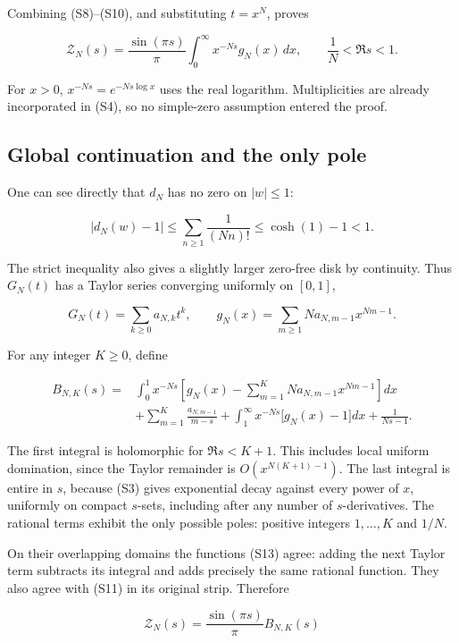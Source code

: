 Combining (S8)--(S10), and substituting \(t=x^N\), proves

\[
\boxed{\mathcal Z_N(s)=\frac{\sin(\pi s)}{\pi}
\int_0^\infty x^{-Ns}g_N(x)\,dx,
\qquad \frac1N<\Re s<1.}
\tag{S11}
\]

For \(x>0\), \(x^{-Ns}=e^{-Ns\log x}\) uses the real logarithm.
Multiplicities are already incorporated in (S4), so no simple-zero
assumption entered the proof.

\hypertarget{global-continuation-and-the-only-pole}{%
\subsection{Global continuation and the only
pole}\label{global-continuation-and-the-only-pole}}

One can see directly that \(d_N\) has no zero on \(|w|\le1\):

\[
|d_N(w)-1|\le\sum_{n\ge1}\frac1{(Nn)!}
\le\cosh(1)-1<1.
\]

The strict inequality also gives a slightly larger zero-free disk by
continuity. Thus \(G_N(t)\) has a Taylor series converging uniformly on
\([0,1]\),

\[
G_N(t)=\sum_{k\ge0}a_{N,k}t^k,
\qquad g_N(x)=\sum_{m\ge1}N a_{N,m-1}x^{Nm-1}.
\tag{S12}
\]

For any integer \(K\ge0\), define

\[
\begin{aligned}
B_{N,K}(s)={}&
\int_0^1x^{-Ns}\left[g_N(x)-\sum_{m=1}^{K}N a_{N,m-1}x^{Nm-1}\right]dx\\
&+\sum_{m=1}^{K}\frac{a_{N,m-1}}{m-s}
 +\int_1^\infty x^{-Ns}\bigl[g_N(x)-1\bigr]dx
 +\frac1{Ns-1}.
\end{aligned}
\tag{S13}
\]

The first integral is holomorphic for \(\Re s<K+1\). This includes local
uniform domination, since the Taylor remainder is \(O(x^{N(K+1)-1})\).
The last integral is entire in \(s\), because (S3) gives exponential
decay against every power of \(x\), uniformly on compact \(s\)-sets,
including after any number of \(s\)-derivatives. The rational terms
exhibit the only possible poles: positive integers \(1,\ldots,K\) and
\(1/N\).

On their overlapping domains the functions (S13) agree: adding the next
Taylor term subtracts its integral and adds precisely the same rational
function. They also agree with (S11) in its original strip. Therefore

\[
\mathcal Z_N(s)=\frac{\sin(\pi s)}{\pi}B_{N,K}(s)
\tag{S14}
\]

